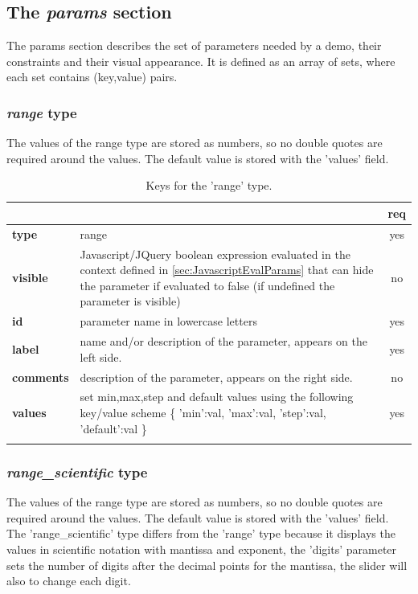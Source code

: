 \subsection{The \emph{params} section}
The params section describes the set of parameters needed by a demo, their 
constraints and their visual appearance. It is defined as an array of sets, 
where each set contains (key,value) pairs.


\subsubsection{ \emph{range} type}

The values of the range type are stored as numbers, so no double quotes are 
required around the values. The default value is stored with the 'values' field.

\begin{longtable}{|>{\bf}L{\linewidth}|L{\linewidth}|c|}
\hline
      &  & {\bf req} 
\tabularnewline \hline \hline
 type  & range       & yes \\ \hline
 visible  & Javascript/JQuery boolean expression evaluated in the context defined 
              in \ref{sec:JavascriptEvalParams} that can hide the parameter if
            evaluated to false (if undefined the parameter is visible)& no \\ \hline
 id     & parameter name in lowercase letters  & yes \\ \hline
 label  & name and/or description of the parameter, appears on the left side. & yes
                      \\ \hline
 comments & description of the parameter, appears on the right side. & no
                      \\ \hline
 values & set min,max,step and default values using the following key/value 
scheme \{ 'min':val, 'max':val, 'step':val, 'default':val \} & yes
                      \\ \hline
\caption{Keys for the 'range' type.}
\end{longtable}

\subsubsection{ \emph{range\_scientific} type}

The values of the range type are stored as numbers, so no double quotes are 
required around the values. The default value is stored with the 'values' field.
The 'range\_scientific' type differs from the 'range' type because it displays
the values in scientific notation with mantissa and exponent, the 'digits' parameter
sets the number of digits after the decimal points for the mantissa, the slider
will also to change each digit.

